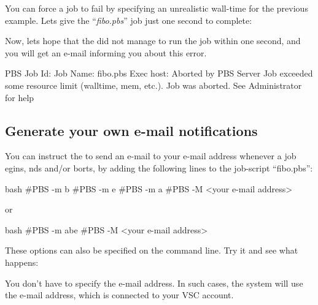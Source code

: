 You can force a job to fail by specifying an unrealistic wall-time for the
previous example.  Lets give the ``\emph{fibo.pbs}'' job just one second to
complete:

\begin{prompt}
\end{prompt}

Now, lets hope that the \hpc did not manage to run the job within one second,
and you will get an e-mail informing you about this error.

\begin{flattext}
PBS Job Id: %
Job Name:   fibo.pbs
Exec host:  %
Aborted by PBS Server
Job exceeded some resource limit (walltime, mem, etc.). Job was aborted.
See Administrator for help
\end{flattext}

\subsection{Generate your own e-mail notifications}

You can instruct the \hpc to send an e-mail to your e-mail address whenever a
job egins, nds and/or borts, by adding the
following lines to the job-script ``fibo.pbs'':

\begin{code}{bash}
#PBS -m b
#PBS -m e
#PBS -m a
#PBS -M <your e-mail address>
\end{code}
or
\begin{code}{bash}
#PBS -m abe
#PBS -M <your e-mail address>
\end{code}

These options can also be specified on the command line.  Try it and see what
happens:

\begin{prompt}
\end{prompt}

You don't have to specify the e-mail address. In such cases, the system will
use the e-mail address, which is connected to your VSC account.

